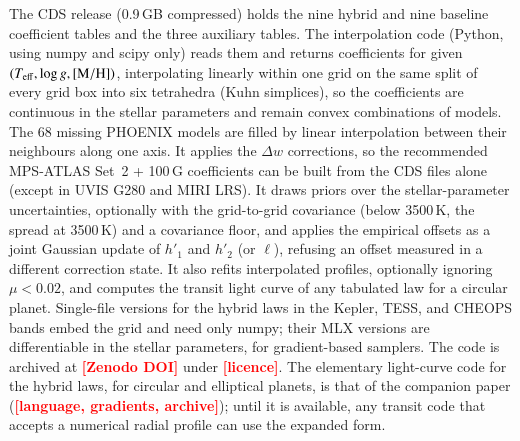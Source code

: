 \documentclass{aa}
\newcommand{\teff}{T_{\rm eff}}
\newcommand{\tbd}[1]{\textcolor{red}{\textbf{[#1]}}}
\begin{document}
The CDS release (0.9\,GB compressed) holds the nine hybrid and nine baseline
coefficient tables and the three auxiliary tables. The interpolation code (Python, using numpy and scipy
only) reads them and returns coefficients for given
$(\teff,\log g,[{\rm M/H}])$, interpolating linearly within one grid on the
same split of every grid box into six tetrahedra (Kuhn simplices), so the
coefficients are continuous in the stellar parameters and remain convex
combinations of models. The 68 missing
PHOENIX models are filled by linear interpolation between their neighbours
along one axis. It applies the $\Delta w$ corrections, so
the recommended MPS-ATLAS Set~2 + 100\,G coefficients can be built from the
CDS files alone (except in UVIS G280 and MIRI LRS). It draws priors over the
stellar-parameter uncertainties, optionally with the grid-to-grid covariance
(below 3500\,K, the spread at 3500\,K) and a covariance floor, and applies the
empirical offsets as a joint Gaussian update of $h'_1$ and $h'_2$ (or $\ell$),
refusing an offset measured in a different correction state. It also refits
interpolated profiles, optionally ignoring $\mu<0.02$, and computes the
transit light curve of any tabulated law for a circular planet.
Single-file versions for the hybrid laws in the Kepler, TESS, and CHEOPS bands embed
the grid and need only numpy; their MLX versions are differentiable in the
stellar parameters, for gradient-based samplers. The code is
archived at \tbd{Zenodo DOI} under \tbd{licence}. The elementary
light-curve code for the hybrid laws, for circular and elliptical planets, is
that of the companion paper \citep{squishier} (\tbd{language, gradients,
archive}); until it is available, any transit code that accepts a numerical
radial profile can use the expanded form.

\end{document}
